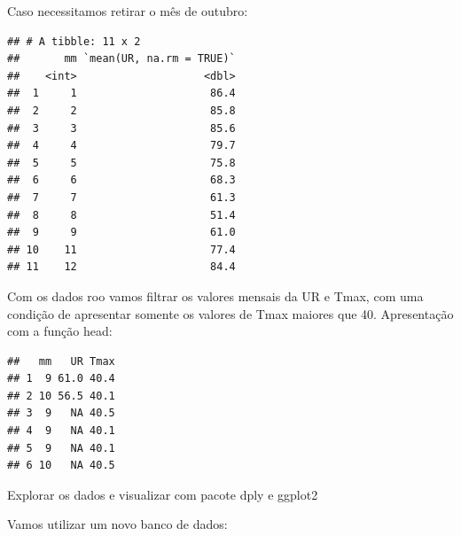 \documentclass[
]{book}
\newenvironment{Shaded}{\begin{snugshade}}{\end{snugshade}}
\newcommand{\DataTypeTok}[1]{\textcolor[rgb]{0.13,0.29,0.53}{#1}}
\newcommand{\DecValTok}[1]{\textcolor[rgb]{0.00,0.00,0.81}{#1}}
\newcommand{\KeywordTok}[1]{\textcolor[rgb]{0.13,0.29,0.53}{\textbf{#1}}}
\newcommand{\NormalTok}[1]{#1}
\newcommand{\OperatorTok}[1]{\textcolor[rgb]{0.81,0.36,0.00}{\textbf{#1}}}
\newcommand{\OtherTok}[1]{\textcolor[rgb]{0.56,0.35,0.01}{#1}}
\newcommand{\StringTok}[1]{\textcolor[rgb]{0.31,0.60,0.02}{#1}}
\begin{document}
Caso necessitamos retirar o mês de outubro:

\begin{Shaded}
\end{Shaded}

\begin{verbatim}
## # A tibble: 11 x 2
##       mm `mean(UR, na.rm = TRUE)`
##    <int>                    <dbl>
##  1     1                     86.4
##  2     2                     85.8
##  3     3                     85.6
##  4     4                     79.7
##  5     5                     75.8
##  6     6                     68.3
##  7     7                     61.3
##  8     8                     51.4
##  9     9                     61.0
## 10    11                     77.4
## 11    12                     84.4
\end{verbatim}

Com os dados roo vamos filtrar os valores mensais da UR e Tmax, com uma condição de apresentar somente os valores de Tmax maiores que 40. Apresentação com a função head:

\begin{Shaded}
\end{Shaded}

\begin{verbatim}
##   mm   UR Tmax
## 1  9 61.0 40.4
## 2 10 56.5 40.1
## 3  9   NA 40.5
## 4  9   NA 40.1
## 5  9   NA 40.1
## 6 10   NA 40.5
\end{verbatim}

Explorar os dados e visualizar com pacote dply e ggplot2

Vamos utilizar um novo banco de dados:
\end{document}
